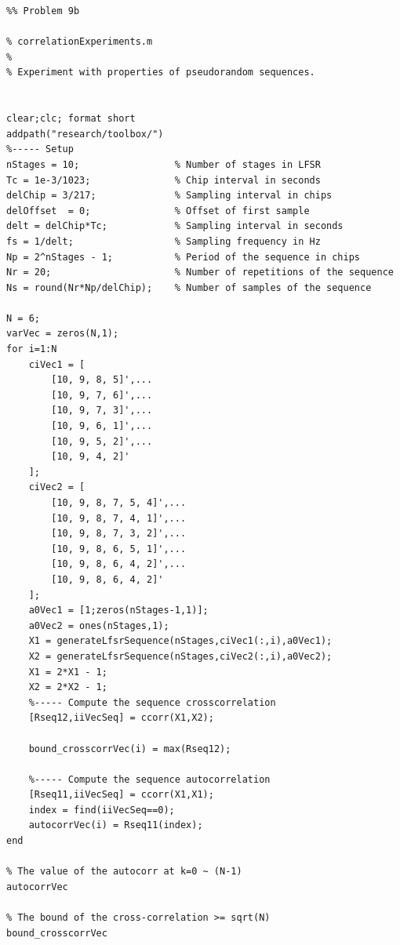 \begin{lstlisting}
%% Problem 9b

% correlationExperiments.m
%
% Experiment with properties of pseudorandom sequences.


clear;clc; format short
addpath("research/toolbox/")
%----- Setup
nStages = 10;                 % Number of stages in LFSR
Tc = 1e-3/1023;               % Chip interval in seconds
delChip = 3/217;              % Sampling interval in chips
delOffset  = 0;               % Offset of first sample
delt = delChip*Tc;            % Sampling interval in seconds
fs = 1/delt;                  % Sampling frequency in Hz
Np = 2^nStages - 1;           % Period of the sequence in chips
Nr = 20;                      % Number of repetitions of the sequence
Ns = round(Nr*Np/delChip);    % Number of samples of the sequence 

N = 6;
varVec = zeros(N,1);
for i=1:N
    ciVec1 = [
        [10, 9, 8, 5]',...  
        [10, 9, 7, 6]',...
        [10, 9, 7, 3]',...
        [10, 9, 6, 1]',...
        [10, 9, 5, 2]',...
        [10, 9, 4, 2]'
    ];
    ciVec2 = [
        [10, 9, 8, 7, 5, 4]',...  
        [10, 9, 8, 7, 4, 1]',...
        [10, 9, 8, 7, 3, 2]',...
        [10, 9, 8, 6, 5, 1]',...
        [10, 9, 8, 6, 4, 2]',...
        [10, 9, 8, 6, 4, 2]'  
    ];
    a0Vec1 = [1;zeros(nStages-1,1)];
    a0Vec2 = ones(nStages,1);
    X1 = generateLfsrSequence(nStages,ciVec1(:,i),a0Vec1);
    X2 = generateLfsrSequence(nStages,ciVec2(:,i),a0Vec2);
    X1 = 2*X1 - 1;
    X2 = 2*X2 - 1;
    %----- Compute the sequence crosscorrelation
    [Rseq12,iiVecSeq] = ccorr(X1,X2);
    
    bound_crosscorrVec(i) = max(Rseq12);

    %----- Compute the sequence autocorrelation
    [Rseq11,iiVecSeq] = ccorr(X1,X1);
    index = find(iiVecSeq==0);
    autocorrVec(i) = Rseq11(index);
end

% The value of the autocorr at k=0 ~ (N-1)
autocorrVec

% The bound of the cross-correlation >= sqrt(N)
bound_crosscorrVec
\end{lstlisting}

